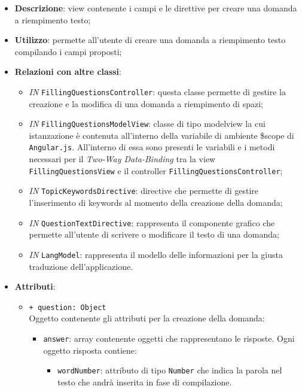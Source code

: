 \begin{itemize}
	\item \textbf{Descrizione}: view contenente i campi e le direttive per creare una domanda a riempimento testo;
	\item \textbf{Utilizzo}:  permette all'utente di creare una domanda a riempimento testo compilando i campi proposti;
	\item \textbf{Relazioni con altre classi}:
	\begin{itemize}
		\item \textit{IN} \texttt{FillingQuestionsController}: questa classe permette di gestire la creazione e la modifica di una domanda a riempimento di spazi;
		\item \textit{IN} \texttt{FillingQuestionsModelView}: classe di tipo modelview la cui istanzazione è contenuta all'interno della variabile di ambiente \$scope di \texttt{Angular.js}. All'interno di essa sono presenti le variabili e i metodi necessari per il \textit{Two-Way Data-Binding} tra la view \texttt{FillingQuestionsView} e il controller \texttt{FillingQuestionsController};
		\item \textit{IN} \texttt{TopicKeywordsDirective}: directive che permette di gestire l'inserimento di keywords al momento della creazione della domanda;
		\item \textit{IN} \texttt{QuestionTextDirective}: rappresenta il componente grafico che permette all'utente di scrivere o modificare il testo di una domanda;
		\item \textit{IN} \texttt{LangModel}: rappresenta il modello delle informazioni per la giusta traduzione dell'applicazione.
	\end{itemize}
	\item \textbf{Attributi}:
	\begin{itemize}
		\item \texttt{+ question: Object} \\ Oggetto contenente gli attributi per la creazione della domanda:
		\begin{itemize}
			\item \texttt{answer}: array contenente oggetti che rappresentano le risposte. Ogni oggetto risposta contiene:
				\begin{itemize}
					\item \texttt{wordNumber}: attributo di tipo \texttt{Number} che indica la parola nel testo che andrà inserita in fase di compilazione.
				\end{itemize}
		\end{itemize}

\end{itemize}
\end{itemize}
